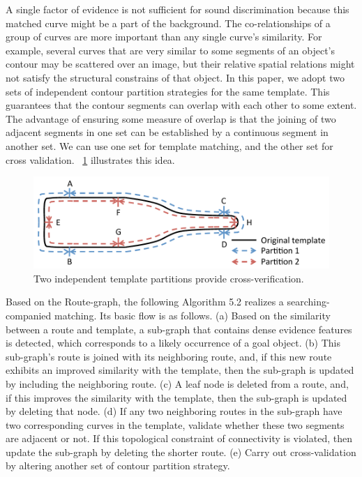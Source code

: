 \documentclass[journal]{IEEEtran}
\begin{document}
A single factor of evidence is not sufficient for sound discrimination because this matched curve might be a part of the background. 
The co-relationships of a group of curves are more important than any single curve's similarity. 
For example, several curves that are very similar to some segments of an object's contour may be scattered over an image, but their relative spatial relations might not satisfy the structural constrains of that object. 
In this paper, we adopt two sets of independent contour partition strategies for the same template. This guarantees that the contour segments can overlap with each other to some extent. The advantage of ensuring some measure of overlap is that the joining of two adjacent segments in one set can be established by a continuous segment in another set.
We can use one set for template matching, and the other set for cross validation. 
\figurename~\ref{fig:16} illustrates this idea.

\begin{figure}[!t]
\centering
\includegraphics[width=0.8\linewidth]{images/fig16.pdf}
\caption{Two independent template partitions provide cross-verification.}
\label{fig:16}
\end{figure}

Based on the Route-graph, the following Algorithm 5.2 realizes a searching-companied matching. 
Its basic flow is as follows. 
(a) Based on the similarity between a route and template, 
a sub-graph that contains dense evidence features is detected, 
which corresponds to a likely occurrence of a goal object. 
(b) This sub-graph's route is joined with its neighboring route, 
and, if this new route exhibits an improved similarity with the template, 
then the sub-graph is updated by including the neighboring route. 
(c) A leaf node is deleted from a route, 
and, if this improves the similarity with the template, 
then the sub-graph is updated by deleting that node. 
(d) If any two neighboring routes in the sub-graph have two corresponding curves in the template, 
validate whether these two segments are adjacent or not. 
If this topological constraint of connectivity is violated, 
then update the sub-graph by deleting the shorter route. 
(e) Carry out cross-validation by altering another set of contour partition strategy.
\end{document}
